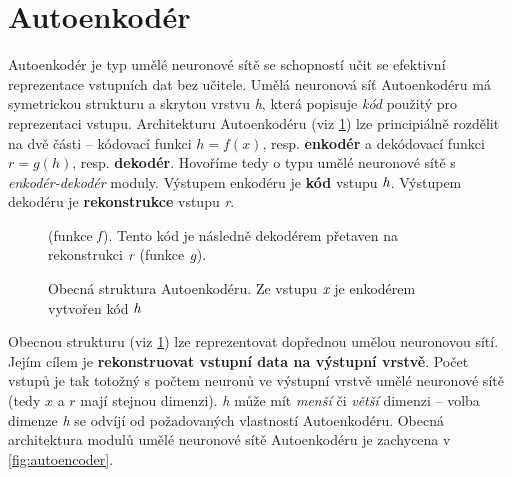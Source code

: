 \section{Autoenkodér}
Autoenkodér je typ umělé neuronové sítě se schopností učit se efektivní reprezentace vstupních dat bez učitele. Umělá neuronová síť Autoenkodéru má symetrickou strukturu a skrytou vrstvu \emph{h}, která popisuje \emph{kód} použitý pro reprezentaci vstupu.
Architekturu Autoenkodéru (viz \ref{fig:basic_autoencoder_structure}) lze principiálně rozdělit na dvě části – kódovací funkci $h = f(x)$, resp. \textbf{enkodér}
a dekódovací funkci $r = g(h)$, resp. \textbf{dekodér}.
Hovoříme tedy o typu umělé neuronové sítě s \emph{enkodér-dekodér} moduly.
Výstupem enkodéru je \textbf{kód} vstupu $\emph{h}$. Výstupem dekodéru je \textbf{rekonstrukce} vstupu \emph{r}.

\begin{figure}[h]
    \centering
    \caption{Obecná struktura Autoenkodéru. Ze vstupu $\emph{x}$ je enkodérem vytvořen kód $\emph{h}$} (funkce $\emph{f}$). Tento kód je následně dekodérem přetaven na rekonstrukci $\emph{r}$ (funkce $\emph{g}$).
    \label{fig:basic_autoencoder_structure}
\end{figure}

Obecnou strukturu (viz \ref{fig:basic_autoencoder_structure}) lze reprezentovat dopřednou umělou neuronovou sítí.
Jejím cílem je \textbf{rekonstruovat vstupní data na výstupní vrstvě}. Počet vstupů je tak totožný s počtem neuronů ve výstupní vrstvě umělé neuronové sítě (tedy $x$ a $r$ mají stejnou dimenzi).
\emph{h} může mít \emph{menší} či \emph{větší} dimenzi – volba dimenze \emph{h} se odvíjí od požadovaných vlastností Autoenkodéru.
Obecná architektura modulů umělé neuronové sítě Autoenkodéru je zachycena v \ref{fig:autoencoder}.



